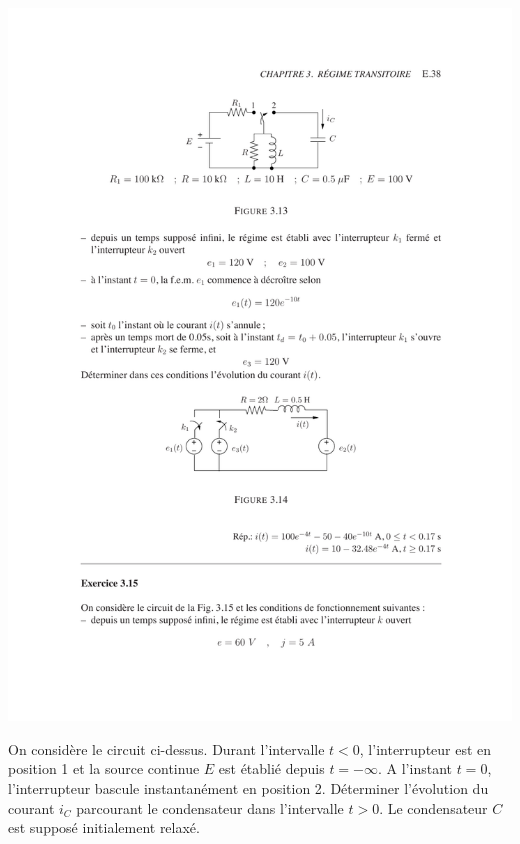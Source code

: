 \begin{exercise}{}
	\label{ex:2-13}
	\begin{center}
		\includegraphics[width=\linewidth]{exercices/ex-3-13}
	\end{center}
	On consid\`ere le circuit ci-dessus. Durant
	l'intervalle $t<0$, l'interrupteur est en position 1 et la source
	continue $E$ est \'etabli\'e depuis $t=-\infty$. A l'instant $t=0$,
	l'interrupteur bascule instantan\'ement en position 2. D\'eterminer
	l'\'evolution du courant $i_C$ parcourant le condensateur dans
	l'intervalle $t>0$. Le condensateur $C$ est suppos\'e initialement
	relax\'e.
	
\end{exercise}

